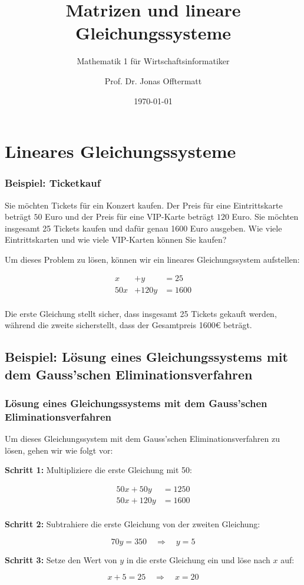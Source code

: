 \documentclass{beamer}
\title{Matrizen und lineare Gleichungssysteme}
\subtitle{Mathematik 1 für Wirtschaftsinformatiker}
\author{Prof. Dr. Jonas Offtermatt}
\date{\today}
\begin{document}
\section{Lineares Gleichungssysteme }
\begin{frame}
  \frametitle{Beispiel: Ticketkauf}
  
  Sie möchten Tickets für ein Konzert kaufen. Der Preis für eine Eintrittskarte beträgt $50$ Euro und der Preis für eine VIP-Karte beträgt $120$ Euro. Sie möchten insgesamt 25 Tickets kaufen und dafür genau 1600 Euro ausgeben. Wie viele Eintrittskarten und wie viele VIP-Karten können Sie kaufen?
  
\end{frame}


\begin{frame} 
  
  Um dieses Problem zu lösen, können wir ein lineares Gleichungssystem aufstellen:
  
    \begin{align*}
    x &+ y &= 25 \\
    50x &+ 120y &= 1600 \\
  \end{align*}
  
  
  Die erste Gleichung stellt sicher, dass insgesamt 25 Tickets gekauft werden, während die zweite sicherstellt, dass der Gesamtpreis 1600€ beträgt.
\end{frame}


\subsection{Beispiel: Lösung eines Gleichungssystems mit dem Gauss'schen Eliminationsverfahren}
\begin{frame}
  \frametitle{Lösung eines Gleichungssystems mit dem Gauss'schen Eliminationsverfahren}
  Um dieses Gleichungssystem mit dem Gauss'schen Eliminationsverfahren zu lösen, gehen wir wie folgt vor:
  
  \vspace{0.3cm}
  
  \textbf{Schritt 1:} Multipliziere die erste Gleichung mit 50:
  
  \[
  \begin{aligned}
    50x + 50y &= 1250 \\
    50x + 120y &= 1600 \\
  \end{aligned}
  \]
  
  \textbf{Schritt 2:} Subtrahiere die erste Gleichung von der zweiten Gleichung:
  
  \[
  70y = 350 \quad \Rightarrow \quad y = 5
  \]
  
  \textbf{Schritt 3:} Setze den Wert von $y$ in die erste Gleichung ein und löse nach $x$ auf:
  
  \[
  x + 5 = 25 \quad \Rightarrow \quad x = 20
  \]
\end{frame}
\end{document}
